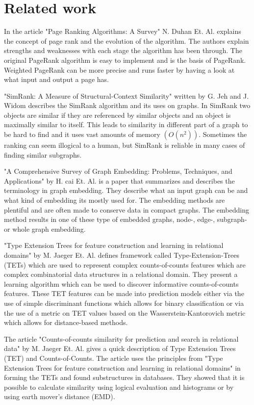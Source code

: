\section{Related work}
In the article "Page Ranking Algorithms: A Survey" N. Duhan Et. Al.\cite{4809246} explains the concept of page rank and the evolution of the algorithm. The authors explain strengths and weaknesses with each stage the algorithm has been through. The original PageRank algorithm is easy to implement and is the basis of PageRank. Weighted PageRank can be more precise and runs faster by having a look at what input and output a page has.

"SimRank: A Measure of Structural-Context Similarity" written by G. Jeh and J. Widom\cite{10.1145/775047.775126} describes the SimRank algorithm and its uses on graphs. In SimRank two objects are similar if they are referenced by similar objects and an object is maximally similar to itself. This leads to similarity in different part of a graph to be hard to find and it uses vast amounts of memory $(O(n^2))$. Sometimes the ranking can seem illogical to a human, but SimRank is reliable in many cases of finding similar subgraphs.

"A Comprehensive Survey of Graph Embedding: Problems, Techniques, and Applications" by H. cai Et. Al.\cite{8294302} is a paper that summarizes and describes the terminology in graph embedding. They describe what an input graph can be and what kind of embedding its mostly used for. The embedding methods are plentiful and are often made to conserve data in compact graphs. The embedding method results in one of these type of embedded graphs, node-, edge-, subgraph- or whole graph embedding.

"Type Extension Trees for feature construction and learning in relational domains" by M. Jaeger Et. Al. \cite{JAEGER201330} defines framework called Type-Extension-Trees (TETs) which are used to represent complex counts-of-counts features which are complex combinatorial data structures in a relational domain. They present a learning algorithm which can be used to discover informative counts-of-counts features. These TET features can be made into prediction models either via the use of simple discriminant functions which allows for binary classification or via the use of a metric on TET values based on the Wasserstein-Kantorovich metric which allows for distance-based methods.

The article "Counts-of-counts similarity for prediction and search in relational data" by M. Jaeger Et. Al.\cite{jaeger2019counts}  gives a quick description of Type Extension Trees (TET) and Counts-of-Counts. The article uses the principles from "Type Extension Trees for feature construction and learning in relational domains" in forming the TETs and found substructures in databases. They showed that it is possible to calculate similarity using logical evaluation and histograms or by using earth mover's distance (EMD).

